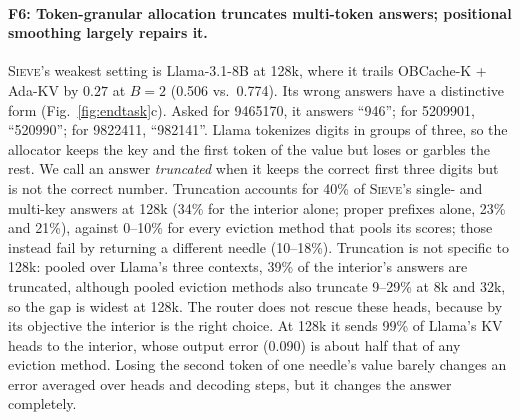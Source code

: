 \documentclass{article}
\newcommand{\sieve}{\textsc{Sieve}}
\theoremstyle{definition}
\begin{document}
\paragraph{F6: Token-granular allocation truncates multi-token answers; positional smoothing largely repairs it.}
\sieve{}'s weakest setting is Llama-3.1-8B at 128k, where it trails OBCache-K + Ada-KV by $0.27$ at $B=2$ (0.506 vs.\ 0.774).  Its wrong answers have a distinctive form (Fig.~\ref{fig:endtask}c).  Asked for 9465170, it answers ``946''; for 5209901, ``520990''; for 9822411, ``982141''.  Llama tokenizes digits in groups of three, so the allocator keeps the key and the first token of the value but loses or garbles the rest.  We call an answer \emph{truncated} when it keeps the correct first three digits but is not the correct number.  Truncation accounts for 40\% of \sieve{}'s single- and multi-key answers at 128k (34\% for the interior alone; proper prefixes alone, 23\% and 21\%), against 0--10\% for every eviction method that pools its scores; those instead fail by returning a different needle (10--18\%).  Truncation is not specific to 128k: pooled over Llama's three contexts, 39\% of the interior's answers are truncated, although pooled eviction methods also truncate 9--29\% at 8k and 32k, so the gap is widest at 128k.  The router does not rescue these heads, because by its objective the interior is the right choice.  At 128k it sends 99\% of Llama's KV heads to the interior, whose output error (0.090) is about half that of any eviction method.  Losing the second token of one needle's value barely changes an error averaged over heads and decoding steps, but it changes the answer completely.
\end{document}
